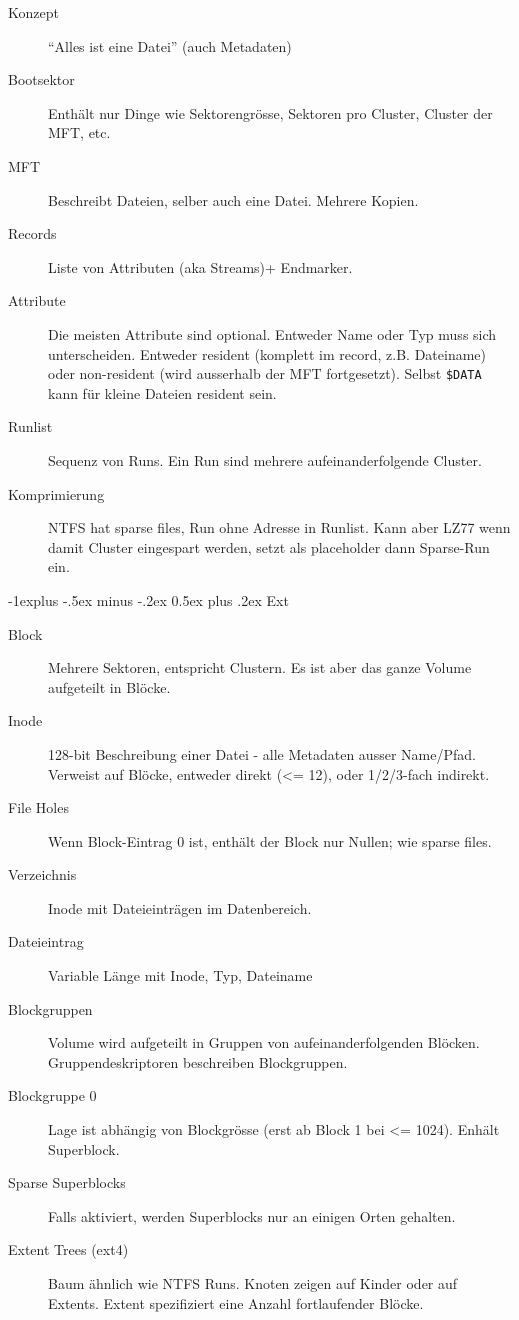 \documentclass[10pt,landscape,a4paper]{article}
\makeatletter
\renewcommand{\subsection}{\@startsection{subsection}{2}{0mm}%
                                {-1explus -.5ex minus -.2ex}%
                                {0.5ex plus .2ex}%
                                {\normalfont\small\bfseries}}
\makeatother
\begin{document}
\begin{multicols*}{3}
\begin{description}
  \item[Konzept] ``Alles ist eine Datei'' (auch Metadaten)
  \item[Bootsektor] Enthält nur Dinge wie Sektorengrösse, Sektoren pro Cluster,
    Cluster der MFT, etc.
  \item[MFT] Beschreibt Dateien, selber auch eine Datei. Mehrere Kopien.
  \item[Records] Liste von Attributen (aka Streams)+ Endmarker.
  \item[Attribute] Die meisten Attribute sind optional. Entweder Name oder Typ
    muss sich unterscheiden. Entweder resident (komplett im record, z.B.
    Dateiname) oder non-resident (wird ausserhalb der MFT fortgesetzt).
    Selbst \verb|$DATA| kann für kleine Dateien resident sein.
  \item[Runlist] Sequenz von Runs. Ein Run sind mehrere aufeinanderfolgende
    Cluster.
  \item[Komprimierung] NTFS hat sparse files, Run ohne Adresse in Runlist. Kann
    aber LZ77 wenn damit Cluster eingespart werden, setzt als placeholder dann
    Sparse-Run ein.
\end{description}

\subsection{Ext}

\begin{description}
  \item[Block] Mehrere Sektoren, entspricht Clustern. Es ist aber das ganze Volume
    aufgeteilt in Blöcke.
  \item[Inode] 128-bit Beschreibung einer Datei - alle Metadaten ausser
    Name/Pfad. Verweist auf Blöcke, entweder direkt (<= 12), oder 1/2/3-fach indirekt.
  \item[File Holes] Wenn Block-Eintrag 0 ist, enthält der Block nur Nullen; wie
    sparse files.
  \item[Verzeichnis] Inode mit Dateieinträgen im Datenbereich.
  \item[Dateieintrag] Variable Länge mit Inode, Typ, Dateiname
  \item[Blockgruppen] Volume wird aufgeteilt in Gruppen von aufeinanderfolgenden
    Blöcken. Gruppendeskriptoren beschreiben Blockgruppen.
  \item[Blockgruppe 0] Lage ist abhängig von Blockgrösse (erst ab Block 1 bei <=
    1024). Enhält Superblock.
  \item[Sparse Superblocks] Falls aktiviert, werden Superblocks nur an einigen
    Orten gehalten.
  \item[Extent Trees (ext4)] Baum ähnlich wie NTFS Runs. Knoten zeigen auf
    Kinder oder auf Extents. Extent spezifiziert eine Anzahl fortlaufender Blöcke.
\end{description}


\end{multicols*}
\end{document}
